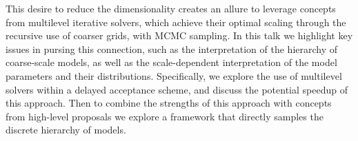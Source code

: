 \documentclass{report}
\begin{document}
This desire to reduce the dimensionality creates an allure to leverage
concepts from multilevel iterative solvers, which achieve their
optimal scaling through the recursive use of coarser grids, with MCMC
sampling. In this talk we highlight key issues in pursing this
connection, such as the interpretation of the hierarchy of
coarse-scale models, as well as the scale-dependent interpretation of
the model parameters and their distributions. Specifically, we
explore the use of multilevel solvers within a delayed acceptance
scheme, and discuss the potential speedup of this approach. Then to
combine the strengths of this approach with concepts from high-level
proposals we explore a framework that directly samples the discrete
hierarchy of models.
\end{document}
